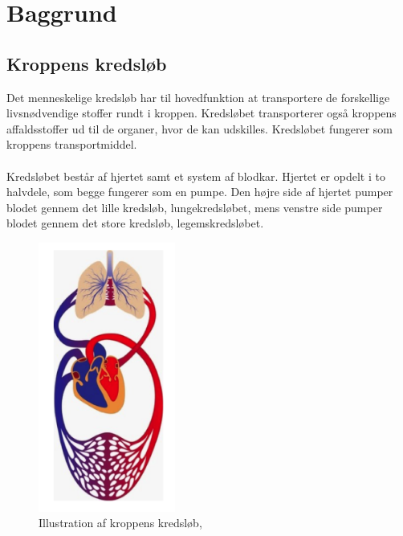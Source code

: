 \chapter{Baggrund}
\section{Kroppens kredsløb}
Det menneskelige kredsløb har til hovedfunktion at transportere de forskellige livsnødvendige stoffer rundt i kroppen. Kredsløbet transporterer også kroppens affaldsstoffer ud til de organer, hvor de kan udskilles. Kredsløbet fungerer som kroppens transportmiddel. 
\\ \\
Kredsløbet består af hjertet samt et system af blodkar. Hjertet er opdelt i to halvdele, som begge fungerer som en pumpe. Den højre side af hjertet pumper blodet gennem det lille kredsløb, lungekredsløbet, mens venstre side pumper blodet gennem det store kredsløb, legemskredsløbet. 

\begin{figure}[H]
	\centering
	\includegraphics[width=0.4\textwidth]{Figurer/Snip20151209_69}
	\caption{Illustration af kroppens kredsløb, \protect\cite{Legemkredslob billede}}
	\end{figure}

